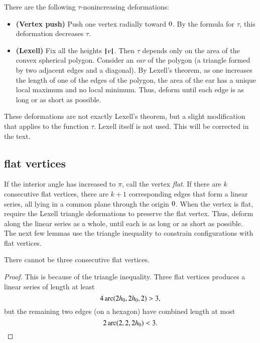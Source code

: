 There are the following $\tau$-nonincreasing deformations:
\begin{itemize}
\item {\bf (Vertex push)} Push one vertex radially toward $0$.  By the formula for $\tau$, this deformation decreases $\tau$.
\item {\bf (Lexell)} Fix all the heights ${{\hskip0.1em|\hskip-0.15em|\hskip0.1em}v{\hskip0.1em|\hskip-0.15em|\hskip0.1em}}$. Then $\tau$ depends only on the area of the convex spherical polygon.  Consider an {\it ear} of the polygon (a triangle formed by two adjacent edges and a diagonal).  By Lexell's theorem, as one increases the length of one of the edges of the polygon, the area of the ear has a unique local maximum and no local minimum.  Thus,  deform until each edge is as long or as short as possible.
\end{itemize}


\begin{note}%
These deformations are not exactly Lexell's theorem, but a slight modification that applies to the function $\tau$.  Lexell itself is not used.  This will be corrected in the text.  
\end{note}

\subsection{flat vertices}


If the interior angle has increased to $\pi$, call the vertex {\it flat}. If there are $k$ consecutive flat vertices, there are  $k+1$ corresponding edges that form a linear series, all lying in a common plane through the origin $0$.  When the vertex is flat, require the Lexell triangle deformations to preserve the flat vertex.  Thus,  deform along the linear series as a whole, until each is as long or as short as possible.  The next few lemmas use the triangle inequality to constrain configurations with flat vertices.

\begin{lemma}
There cannot be three consecutive flat vertices.
\end{lemma}

\begin{proof} This is because of the triangle inequality.  Three flat vertices produces a linear series of length at least
$$
4\operatorname{arc}(2{h_0},2{h_0},2) > 3,
$$
but the remaining two edges (on a hexagon) have combined length at most
$$
2\operatorname{arc}(2,2,2{h_0}) < 3.
$$
\end{proof}


